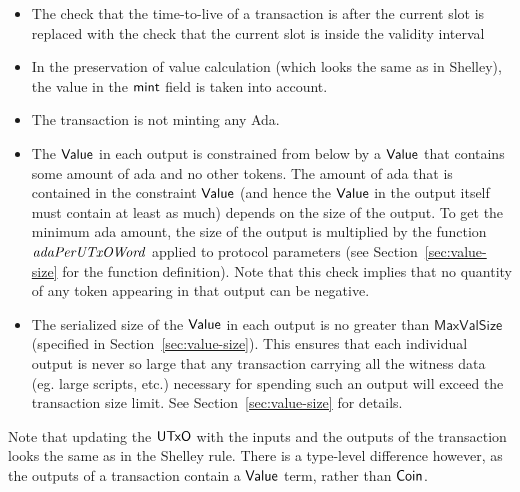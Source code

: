 \begin{itemize}
  \item The check that the time-to-live of a transaction is after the current
  slot is replaced with the check that the current slot is inside the validity interval

  \item In the preservation of value calculation (which looks the same as in
  Shelley), the value in the $\mathsf{mint}$ field is taken into account.

  \item The transaction is not minting any Ada.

  \item The $\mathsf{Value}$ in each output is constrained from below by a
    $\mathsf{Value}$ that contains some amount of ada and no other tokens.
    The amount of ada that is contained in the constraint $\mathsf{Value}$ (and
    hence the $\mathsf{Value}$ in the output itself must contain at least as much) depends on the
    size of the output. To get the minimum ada amount, the size of the output is multiplied by
    the function $\mathit{adaPerUTxOWord}$ applied to protocol parameters
    (see Section~\ref{sec:value-size} for the function definition).
    Note that this check implies that no quantity of any token appearing in that output can be
    negative.

    \item The serialized size of the $\mathsf{Value}$ in each output is no greater than $\mathsf{MaxValSize}$
    (specified in Section~\ref{sec:value-size}).
    This ensures that each individual output is never so large that any transaction carrying all the
    witness data (eg. large scripts, etc.) necessary for spending such an output will exceed the transaction size limit.
    See Section~\ref{sec:value-size} for details.
\end{itemize}

Note that updating the $\mathsf{UTxO}$ with the inputs and the outputs of the transaction
looks the same as in the Shelley rule. There is a type-level difference however, as
the outputs of a transaction contain a $\mathsf{Value}$ term, rather than
$\mathsf{Coin}$.


